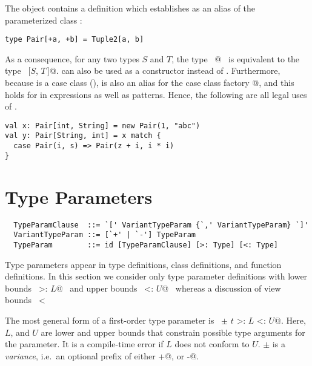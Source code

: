 \example The  object contains a definition which establishes  
as an alias of the parameterized class :
\begin{lstlisting}
type Pair[+a, +b] = Tuple2[a, b] 
\end{lstlisting}
As a consequence, for any two types $S$ and $T$, the type
~\lstinline@Pair[$S$, $T\,$]@~ is equivalent to the type ~[$S$, $T\,$]@.
 can also be used as a constructor instead of .
Furthermore, because  is a case class (),
 is also an alias for the case class factory @, and this holds
for in expressions as well as patterns. Hence, the following are all legal uses of \lstinline@Pair@.
\begin{lstlisting}
val x: Pair[int, String] = new Pair(1, "abc")
val y: Pair[String, int] = x match {
  case Pair(i, s) => Pair(z + i, i * i)
}
\end{lstlisting}

\section{Type Parameters}\label{sec:type-params}

\syntax\begin{lstlisting}
  TypeParamClause  ::= `[' VariantTypeParam {`,' VariantTypeParam} `]'
  VariantTypeParam ::= [`+' | `-'] TypeParam
  TypeParam        ::= id [TypeParamClause] [>: Type] [<: Type]
\end{lstlisting}

Type parameters appear in type definitions, class definitions, and
function definitions.  In this section we consider only type parameter
definitions with lower bounds ~\lstinline@>: $L$@~ and upper bounds
~\lstinline@<: $U$@~ whereas a discussion of view bounds
~\lstinline@<% $U$@~ is deferred to Section~\ref{sec:view-bounds}.

The most general form of a first-order type parameter is ~\lstinline@$\pm$ $t$ >: $L$ <: $U$@.  
Here, $L$, and $U$ are lower and upper bounds that
constrain possible type arguments for the parameter.  It is a
compile-time error if $L$ does not conform to $U$. $\pm$ is a {\em
variance}, i.e.\ an optional prefix of either \lstinline@+@, or
\lstinline@-@.


